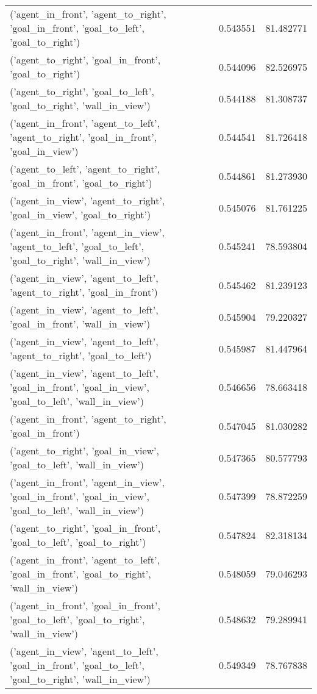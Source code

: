 \begin{tabular}{lrr}
('agent\_in\_front', 'agent\_to\_right', 'goal\_in\_front', 'goal\_to\_left', 'goal\_to\_right') & 0.543551 & 81.482771 \\
('agent\_to\_right', 'goal\_in\_front', 'goal\_to\_right') & 0.544096 & 82.526975 \\
('agent\_to\_right', 'goal\_to\_left', 'goal\_to\_right', 'wall\_in\_view') & 0.544188 & 81.308737 \\
('agent\_in\_front', 'agent\_to\_left', 'agent\_to\_right', 'goal\_in\_front', 'goal\_in\_view') & 0.544541 & 81.726418 \\
('agent\_to\_left', 'agent\_to\_right', 'goal\_in\_front', 'goal\_to\_right') & 0.544861 & 81.273930 \\
('agent\_in\_view', 'agent\_to\_right', 'goal\_in\_view', 'goal\_to\_right') & 0.545076 & 81.761225 \\
('agent\_in\_front', 'agent\_in\_view', 'agent\_to\_left', 'goal\_to\_left', 'goal\_to\_right', 'wall\_in\_view') & 0.545241 & 78.593804 \\
('agent\_in\_view', 'agent\_to\_left', 'agent\_to\_right', 'goal\_in\_front') & 0.545462 & 81.239123 \\
('agent\_in\_view', 'agent\_to\_left', 'goal\_in\_front', 'wall\_in\_view') & 0.545904 & 79.220327 \\
('agent\_in\_view', 'agent\_to\_left', 'agent\_to\_right', 'goal\_to\_left') & 0.545987 & 81.447964 \\
('agent\_in\_view', 'agent\_to\_left', 'goal\_in\_front', 'goal\_in\_view', 'goal\_to\_left', 'wall\_in\_view') & 0.546656 & 78.663418 \\
('agent\_in\_front', 'agent\_to\_right', 'goal\_in\_front') & 0.547045 & 81.030282 \\
('agent\_to\_right', 'goal\_in\_view', 'goal\_to\_left', 'wall\_in\_view') & 0.547365 & 80.577793 \\
('agent\_in\_front', 'agent\_in\_view', 'goal\_in\_front', 'goal\_in\_view', 'goal\_to\_left', 'wall\_in\_view') & 0.547399 & 78.872259 \\
('agent\_to\_right', 'goal\_in\_front', 'goal\_to\_left', 'goal\_to\_right') & 0.547824 & 82.318134 \\
('agent\_in\_front', 'agent\_to\_left', 'goal\_in\_front', 'goal\_to\_right', 'wall\_in\_view') & 0.548059 & 79.046293 \\
('agent\_in\_front', 'goal\_in\_front', 'goal\_to\_left', 'goal\_to\_right', 'wall\_in\_view') & 0.548632 & 79.289941 \\
('agent\_in\_view', 'agent\_to\_left', 'goal\_in\_front', 'goal\_to\_left', 'goal\_to\_right', 'wall\_in\_view') & 0.549349 & 78.767838 \\

\end{tabular}
